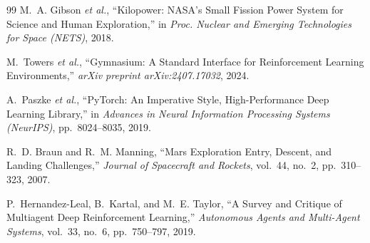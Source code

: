 \documentclass[11pt,a4paper]{ctexart}
\begin{document}
\begin{thebibliography}{99}
M.~A. Gibson \textit{et al.},
``Kilopower: NASA's Small Fission Power System for Science and Human Exploration,''
in \textit{Proc. Nuclear and Emerging Technologies for Space (NETS)}, 2018.

M.~Towers \textit{et al.},
``Gymnasium: A Standard Interface for Reinforcement Learning Environments,''
\textit{arXiv preprint arXiv:2407.17032}, 2024.

A.~Paszke \textit{et al.},
``PyTorch: An Imperative Style, High-Performance Deep Learning Library,''
in \textit{Advances in Neural Information Processing Systems (NeurIPS)}, pp.~8024--8035, 2019.

R.~D. Braun and R.~M. Manning,
``Mars Exploration Entry, Descent, and Landing Challenges,''
\textit{Journal of Spacecraft and Rockets}, vol.~44, no.~2, pp.~310--323, 2007.

P.~Hernandez-Leal, B.~Kartal, and M.~E. Taylor,
``A Survey and Critique of Multiagent Deep Reinforcement Learning,''
\textit{Autonomous Agents and Multi-Agent Systems}, vol.~33, no.~6, pp.~750--797, 2019.

\end{thebibliography}
\end{document}

